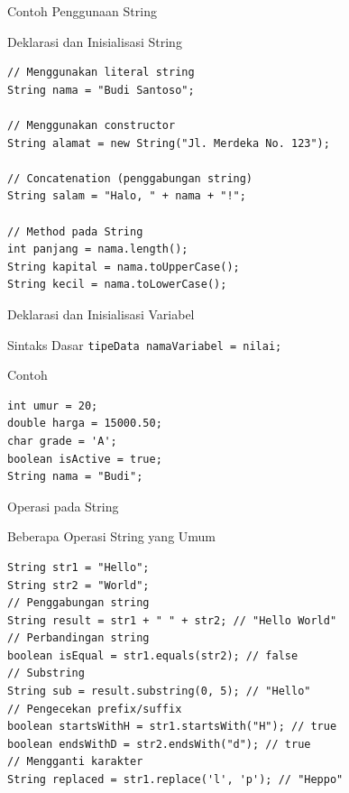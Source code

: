 \documentclass{beamer}
\begin{document}
\begin{frame}[fragile]{Contoh Penggunaan String}
  \begin{exampleblock}{Deklarasi dan Inisialisasi String\\}
\begin{lstlisting}
// Menggunakan literal string
String nama = "Budi Santoso";

// Menggunakan constructor
String alamat = new String("Jl. Merdeka No. 123");

// Concatenation (penggabungan string)
String salam = "Halo, " + nama + "!";

// Method pada String
int panjang = nama.length();
String kapital = nama.toUpperCase();
String kecil = nama.toLowerCase();
\end{lstlisting}
  \end{exampleblock}
\end{frame}

\begin{frame}[fragile]{Deklarasi dan Inisialisasi Variabel}
  \begin{block}{Sintaks Dasar}
    \texttt{tipeData namaVariabel = nilai;}
  \end{block}
  
  \begin{exampleblock}{Contoh}
\begin{lstlisting}
int umur = 20;
double harga = 15000.50;
char grade = 'A';
boolean isActive = true;
String nama = "Budi";
\end{lstlisting}
  \end{exampleblock}
\end{frame}

\begin{frame}[fragile]{Operasi pada String}
  \begin{exampleblock}{Beberapa Operasi String yang Umum\\}
\begin{lstlisting}
String str1 = "Hello";
String str2 = "World";
// Penggabungan string
String result = str1 + " " + str2; // "Hello World"
// Perbandingan string
boolean isEqual = str1.equals(str2); // false
// Substring
String sub = result.substring(0, 5); // "Hello"
// Pengecekan prefix/suffix
boolean startsWithH = str1.startsWith("H"); // true
boolean endsWithD = str2.endsWith("d"); // true
// Mengganti karakter
String replaced = str1.replace('l', 'p'); // "Heppo"
\end{lstlisting}
  \end{exampleblock}
\end{frame}
\end{document}
